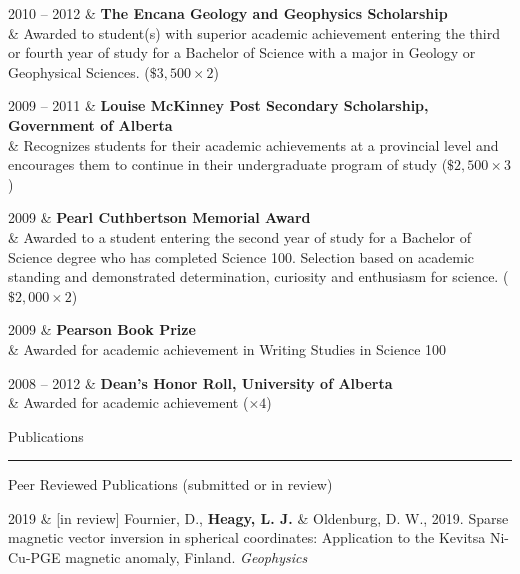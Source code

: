 \documentclass[a4paper, 11pt]{article}
\newcommand{\heading}[1]{
    \begin{minipage}[t]{\textwidth}
    \vspace{0.12cm}
    {\LARGE #1}\\
    \vspace{-0.24cm}
    \hrule
    \end{minipage}
    \vspace{0.05cm}

}
\newcommand{\subheading}[1]{
    \vspace{0.5cm}
    {\Large #1}\\
    \vspace{-0.2cm}
}
\begin{document}
\begin{entryright}
2010 -- 2012 & \textbf{The Encana Geology and Geophysics Scholarship} \\
& Awarded to student(s) with superior academic achievement entering the third or fourth year of study for a Bachelor of Science with a major in Geology or Geophysical Sciences. ($\$3,500 \times 2$)
\end{entryright}

\begin{entryright}
2009 -- 2011 & \textbf{Louise McKinney Post Secondary Scholarship, Government of Alberta} \\
& Recognizes students for their academic achievements at a provincial level and encourages them to continue in their undergraduate program of study ($\$2,500 \times 3$)
\end{entryright}

\begin{entryright}
2009 & \textbf{Pearl Cuthbertson Memorial Award} \\
& Awarded to a student entering the second year of study for a Bachelor of Science degree who has completed Science 100. Selection based on academic standing and demonstrated determination, curiosity and enthusiasm for science. ($\$2,000 \times 2$)
\end{entryright}

\begin{entryright}
2009 & \textbf{Pearson Book Prize}\\
& Awarded for academic achievement in Writing Studies in Science 100
\end{entryright}

\begin{entryright}
2008 -- 2012 & \textbf{Dean's Honor Roll, University of Alberta} \\
& Awarded for academic achievement ($\times 4$)
\end{entryright}

\heading{Publications}
\label{sec:publications}

% 
% 

\subheading{Peer Reviewed Publications (submitted or in review)}

\begin{entryright}
2019 & [in review] Fournier, D., \textbf{Heagy, L. J.} \& Oldenburg, D. W., 2019. Sparse magnetic vector inversion in spherical coordinates: Application to the Kevitsa Ni-Cu-PGE magnetic anomaly, Finland. \emph{Geophysics}
\end{entryright}
\end{document}
